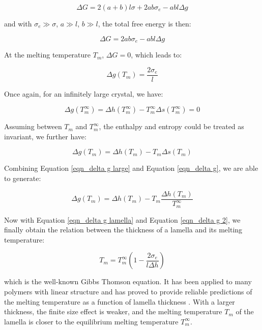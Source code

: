 \begin{equation}
\label{eqn_delta G lamella}
\Delta G = 2(a+b)l\sigma + 2ab\sigma_{e} - abl\Delta g
\end{equation}

\noindent
and with $\sigma_{e}\gg\sigma$, $a\gg l$, $b\gg l$, the total free energy is then:

\begin{equation}
\label{eqn_delta G lamella reduced}
\Delta G = 2ab\sigma_{e} - abl\Delta g
\end{equation}

At the melting temperature $T_{m}$, $\Delta G = 0$, which leads to:

\begin{equation}
\label{eqn_delta g lamella}
\Delta g (T_{m}) = \dfrac{2\sigma_{e}}{l}
\end{equation}

Once again, for an infinitely large crystal, we have:

\begin{equation}
\label{eqn_delta g large}
\Delta g (T_{m}^{\infty}) = \Delta h (T_{m}^{\infty}) - T_{m}^{\infty}\Delta s (T_{m}^{\infty}) = 0
\end{equation}

Assuming between $T_{m}$ and $T_{m}^{\infty}$, the enthalpy and entropy could be treated as invariant, we further have:

\begin{equation}
\label{eqn_delta g}
\Delta g (T_{m}) = \Delta h (T_{m}) - T_{m}\Delta s (T_{m})
\end{equation}

Combining Equation \ref{eqn_delta g large} and Equation \ref{eqn_delta g}, we are able to generate:

\begin{equation}
\label{eqn_delta g 2}
\Delta g (T_{m}) = \Delta h (T_{m}) - T_{m}\dfrac{\Delta h (T_{m})}{T_{m}^{\infty}}
\end{equation}

Now with Equation \ref{eqn_delta g lamella} and Equation \ref{eqn_delta g 2}, we finally obtain the relation between the thickness of a lamella and its melting temperature:

\begin{equation}
\label{eqn_GT}
T_{m} = T_{m}^{\infty} (1 - \dfrac{2\sigma_{e}}{l \Delta h})
\end{equation}

\noindent
which is the well-known Gibbs Thomson equation. It has been applied to many polymers with linear structure and has proved to provide reliable predictions of the melting temperature as a function of lamella thickness \cite{KojiYamada2003}. With a larger thickness, the finite size effect is weaker, and the melting temperature $T_{m}$ of the lamella is closer to the equilibrium melting temperature $T_{m}^{\infty}$.

